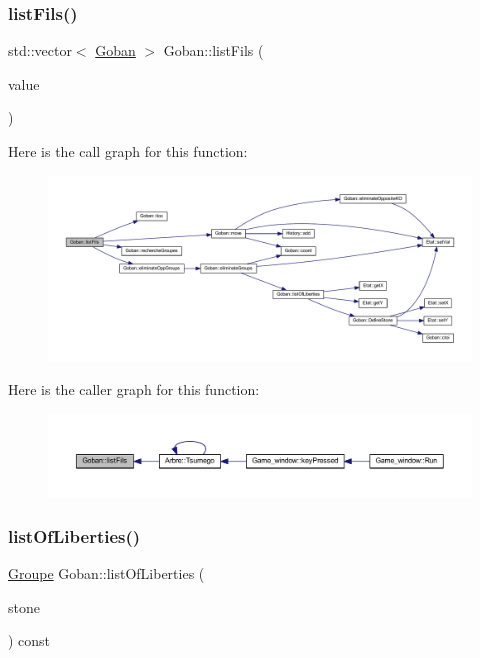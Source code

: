 \subsubsection{\texorpdfstring{list\+Fils()}{listFils()}}
{\footnotesize\ttfamily std\+::vector$<$ \hyperlink{class_goban}{Goban} $>$ Goban\+::list\+Fils (\begin{DoxyParamCaption}\item[{const \hyperlink{class_etat_af3ddb2296ffc379b7f3ad2bf832f294e}{Etat\+::\+V\+AL}}]{value }\end{DoxyParamCaption})}

Here is the call graph for this function\+:\nopagebreak
\begin{figure}[H]
\begin{center}
\leavevmode
\includegraphics[width=350pt]{class_goban_a36ab256c9430e070b620052a0f13f051_cgraph}
\end{center}
\end{figure}
Here is the caller graph for this function\+:\nopagebreak
\begin{figure}[H]
\begin{center}
\leavevmode
\includegraphics[width=350pt]{class_goban_a36ab256c9430e070b620052a0f13f051_icgraph}
\end{center}
\end{figure}
\mbox{\label{class_goban_a84f36324eb9ddc29f522d481f04c13e7}} 
\subsubsection{\texorpdfstring{list\+Of\+Liberties()}{listOfLiberties()}}
{\footnotesize\ttfamily \hyperlink{class_groupe}{Groupe} Goban\+::list\+Of\+Liberties (\begin{DoxyParamCaption}\item[{const \hyperlink{class_etat}{Etat} \&}]{stone }\end{DoxyParamCaption}) const}

